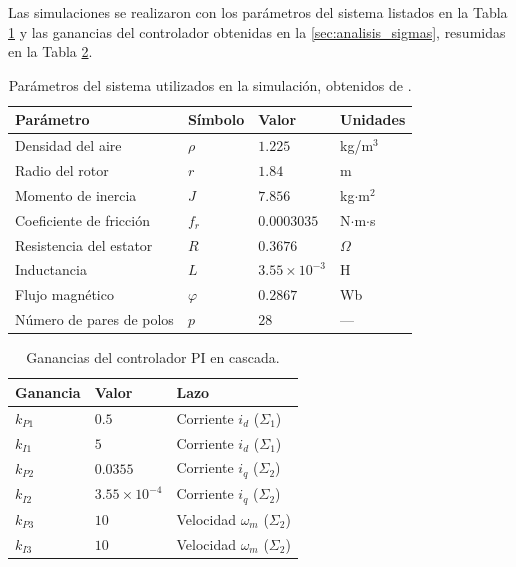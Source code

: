 Las simulaciones se realizaron con los parámetros del sistema listados en la
Tabla \ref{tab:parametros_sim} y las ganancias del controlador obtenidas en la
\autoref{sec:analisis_sigmas}, resumidas en la Tabla \ref{tab:ganancias}.
\\

\begin{table}[ht]
\centering
\caption{Parámetros del sistema utilizados en la simulación, obtenidos de \cite{Gao2016}.}
\label{tab:parametros_sim}
\begin{tabular}{llll}
\hline
Parámetro & Símbolo & Valor & Unidades \\ \hline
Densidad del aire        & $\rho$  & $1.225$  & kg/m$^3$ \\
Radio del rotor          & $r$     & $1.84$ & m        \\
Momento de inercia       & $J$     & $7.856$ & kg$\cdot$m$^2$ \\
Coeficiente de fricción  & $f_r$   & $0.0003035$ & N$\cdot$m$\cdot$s \\
Resistencia del estator  & $R$     & $0.3676$ & $\Omega$ \\
Inductancia              & $L$     & $3.55\times 10^{-3}$ & H        \\
Flujo magnético          & $\varphi$ & $0.2867$ & Wb     \\
Número de pares de polos & $p$     & $28$ & ---      \\ \hline
\end{tabular}
\end{table}

\begin{table}[ht]
\centering
\caption{Ganancias del controlador PI en cascada.}
\label{tab:ganancias}
\begin{tabular}{lll}
\hline
Ganancia & Valor & Lazo \\ \hline
$k_{P1}$ & $0.5$ & Corriente $i_d$ ($\Sigma_1$) \\
$k_{I1}$ & $5$ & Corriente $i_d$ ($\Sigma_1$) \\
$k_{P2}$ & $0.0355$         & Corriente $i_q$ ($\Sigma_2$) \\
$k_{I2}$ & $3.55\times10^{-4}$ & Corriente $i_q$ ($\Sigma_2$) \\
$k_{P3}$ & $10$             & Velocidad $\omega_m$ ($\Sigma_2$) \\
$k_{I3}$ & $10$             & Velocidad $\omega_m$ ($\Sigma_2$) \\ \hline
\end{tabular}
\end{table}

